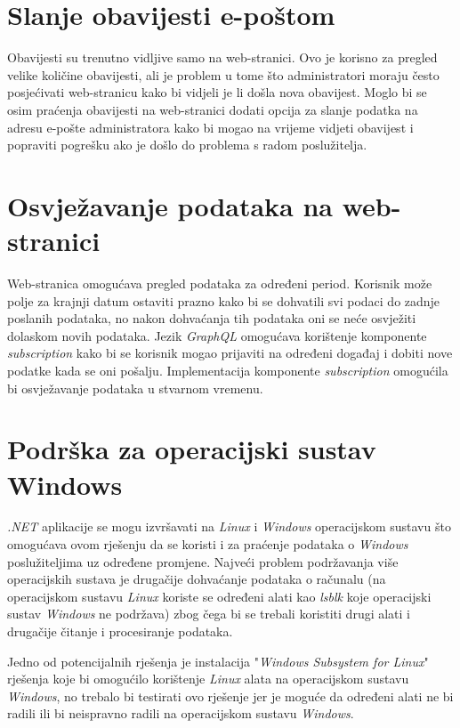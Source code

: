 \documentclass[zavrsnirad]{fer}
\begin{document}
\section{Slanje obavijesti e-poštom}
Obavijesti su trenutno vidljive samo na web-stranici. Ovo je korisno za pregled velike količine obavijesti, ali je problem u tome što administratori moraju često posjećivati web-stranicu kako bi vidjeli je li došla nova obavijest. Moglo bi se osim praćenja obavijesti na web-stranici dodati opcija za slanje podatka na adresu e-pošte administratora kako bi mogao na vrijeme vidjeti obavijest i popraviti pogrešku ako je došlo do problema s radom poslužitelja.

\section{Osvježavanje podataka na web-stranici}
Web-stranica omogućava pregled podataka za određeni period. Korisnik može polje za krajnji datum ostaviti prazno kako bi se dohvatili svi podaci do zadnje poslanih podataka, no nakon dohvaćanja tih podataka oni se neće osvježiti dolaskom novih podataka. Jezik \textit{GraphQL} omogućava korištenje komponente \textit{subscription} kako bi se korisnik mogao prijaviti na određeni događaj i dobiti nove podatke kada se oni pošalju. Implementacija komponente \textit{subscription} omogućila bi osvježavanje podataka u stvarnom vremenu.

\section{Podrška za operacijski sustav Windows}
\textit{.NET} aplikacije se mogu izvršavati na \textit{Linux} i \textit{Windows} operacijskom sustavu što omogućava ovom rješenju da se koristi i za praćenje podataka o \textit{Windows} poslužiteljima uz određene promjene. Najveći problem podržavanja više operacijskih sustava je drugačije dohvaćanje podataka o računalu (na operacijskom sustavu \textit{Linux} koriste se određeni alati kao \textit{lsblk} koje operacijski sustav \textit{Windows} ne podržava) zbog čega bi se trebali koristiti drugi alati i drugačije čitanje i procesiranje podataka.

Jedno od potencijalnih rješenja je instalacija "\textit{Windows Subsystem for Linux}" rješenja koje bi omogućilo korištenje \textit{Linux} alata na operacijskom sustavu \textit{Windows}, no trebalo bi testirati ovo rješenje jer je moguće da određeni alati ne bi radili ili bi neispravno radili na operacijskom sustavu \textit{Windows}.
\end{document}
